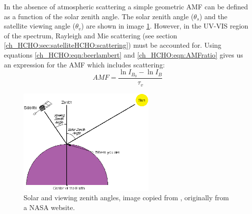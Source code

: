     In the absence of atmospheric scattering a simple geometric AMF can be defined as a function of the solar zenith angle. 
    The solar zenith angle ($\theta_s$) and the satellite viewing angle ($\theta_v$) are shown in image \ref{ch_HCHO:fig:zenithangle}.
    However, in the UV-VIS region of the spectrum, Rayleigh and Mie scattering (see section \ref{ch_HCHO:sec:satelliteHCHO:scattering}) must be accounted for.
    Using equations \ref{ch_HCHO:eqn:beerlambert} and \ref{ch_HCHO:eqn:AMFratio} gives us an expression for the AMF which includes scattering:
    \begin{equation} \label{Model:omiRecalc:eqn_amfscattering}
    AMF = \frac{\ln{I_{B_0}}-\ln{I_B}}{\tau_v}
    \end{equation}
    
    \begin{figure}[!htbp]\begin{center}
      \includegraphics[width=0.6\textwidth]{Figures/ZenithAngles.png}
      \caption{Solar and viewing zenith angles, image copied from \textcite{SZA_Image}, originally from a NASA website.}
      \label{ch_HCHO:fig:zenithangle}
    \end{center}\end{figure}
    
